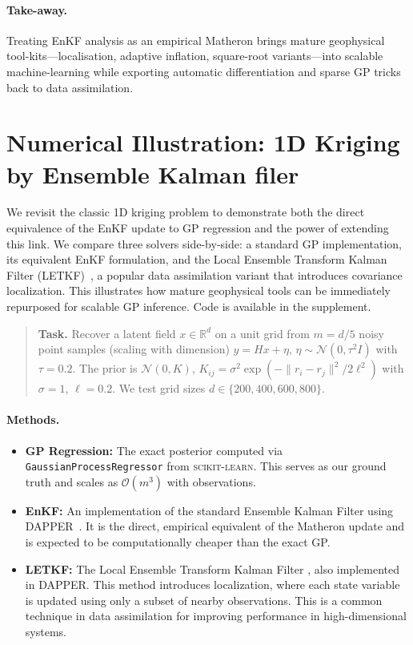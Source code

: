 \documentclass[wcp]{jmlr} %
\begin{document}
\paragraph{Take-away.}
Treating EnKF analysis as an empirical Matheron  brings mature geophysical tool-kits—localisation, adaptive inflation, square-root variants—into scalable machine-learning while exporting automatic differentiation and sparse GP tricks back to data assimilation.

\section{Numerical Illustration:  1D Kriging by Ensemble Kalman filer}
\label{sec:numerical-demo}

We revisit the classic 1D kriging problem to demonstrate both the direct equivalence of the EnKF update to GP regression and the power of extending this link. We compare three solvers side-by-side: a standard GP implementation, its equivalent EnKF formulation, and the Local Ensemble Transform Kalman Filter (LETKF)~\citep{Bocquet2020Online,Hunt2007Efficient}, a popular data assimilation variant that introduces covariance localization. This illustrates how mature geophysical tools can be immediately repurposed for scalable GP inference. Code is available in the supplement.

\begin{quote}
\textbf{Task.}  Recover a latent field
$x\!\in\!\mathbb R^{d}$ on a unit grid from
$m\!=\!d/5$ noisy point samples (scaling with dimension)
$y = Hx + \eta$, $\eta\!\sim\!\mathcal N(0,\tau^{2}I)$ with
$\tau=0.2$.  The prior is
$\mathcal N(0,K)$, $K_{ij}=\sigma^{2}\!\exp(-\lVert r_i-r_j\rVert^{2}/2\ell^{2})$
with $\sigma=1$, $\ell=0.2$.
We test grid sizes $d\in\{200,400,600,800\}$.
\end{quote}

\paragraph{Methods.}
\begin{itemize}
    \item \textbf{GP Regression:} The exact posterior computed via \texttt{GaussianProcessRegressor} from \textsc{scikit-learn}. This serves as our ground truth and scales as $\mathcal{O}(m^3)$ with observations.
    \item \textbf{EnKF:} An implementation of the standard Ensemble Kalman Filter using DAPPER~\citep{Raanes2024DAPPER}. It is the direct, empirical equivalent of the Matheron update and is expected to be computationally cheaper than the exact GP.
    \item \textbf{LETKF:} The Local Ensemble Transform Kalman Filter \citep{Hunt2007Efficient,Bocquet2020Online}, also implemented in DAPPER. This method introduces localization, where each state variable is updated using only a subset of nearby observations. This is a common technique in data assimilation for improving performance in high-dimensional systems.
\end{itemize}
\end{document}
